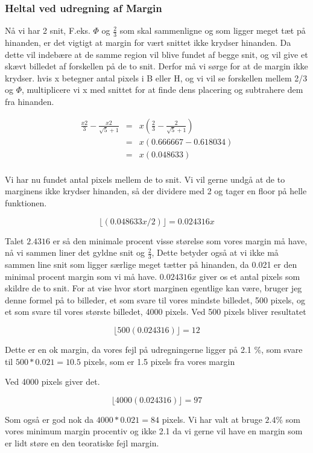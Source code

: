 \subsubsection{Heltal ved udregning af Margin}
Nå vi har 2 snit, F.eks. $\varPhi$ og $\frac{2}{3}$ som skal sammenligne og
som ligger meget tæt på hinanden, er det vigtigt at margin for vært
snittet ikke krydser hinanden. Da dette vil indebære at de samme region
vil blive fundet af begge snit, og vil give et skævt billedet af
forskellen på de to snit. Derfor må vi sørge for at de margin ikke
krydser. hvis x betegner antal pixels i B eller H, og vi vil se
forskellen mellem 2/3 og $\varPhi$, multiplicere vi x med snittet for at
finde dens placering og subtrahere dem fra hinanden.

\begin{eqnarray}
	\frac{x2}{3}-\frac{x2}{\sqrt{5}+1} &=& x(\frac{2}{3}-\frac{2}{\sqrt{5}+1}) \\ \nonumber
	&=& x(0.666667-0.618034) \\ \nonumber
	&=& x(0.048633) \\
\end{eqnarray}

Vi har nu fundet antal pixels mellem de to snit. Vi vil gerne undgå at
de to marginens ikke krydser hinanden, så der dividere med 2 og tager en
floor på helle funktionen.

\begin{equation}
	\lfloor(0.048633x/2)\rfloor = 0.024316x
\end{equation}

Talet $2.4316$ er så den minimale procent visse størelse som vores
margin må have, nå vi sammen liner det gyldne snit og $\frac{2}{3}$,
Dette betyder også at vi ikke må sammen line snit som ligger særlige
meget tætter på hinanden, da 0.021 er den minimal procent margin som vi må have.
$0.024316x$ giver os et antal pixels som skildre de to snit. For at vise
hvor stort marginen egentlige kan være, bruger jeg denne formel på to
billeder, et som svare til vores mindste billedet, 500 pixels, og et
som svare til vores største billedet, 4000 pixels. Ved 500 pixels
bliver resultatet

\begin{equation}
	 \lfloor 500(0.024316)\rfloor = 12
\end{equation}

Dette er en ok margin, da vores fejl på udregningerne ligger på 2.1 \%,
som svare til $500*0.021 = 10.5$ pixels, som er 1.5 pixels fra vores
margin

Ved 4000 pixels giver det.

\begin{equation}
	 \lfloor 4000(0.024316)\rfloor = 97
\end{equation}

Som også er god nok da $4000*0.021 = 84$ pixels. Vi har valt at bruge
$2.4\%$ som vores minimum margin procentiv og ikke 2.1 da vi gerne
vil have en margin som er lidt støre en den teoratiske fejl margin.
